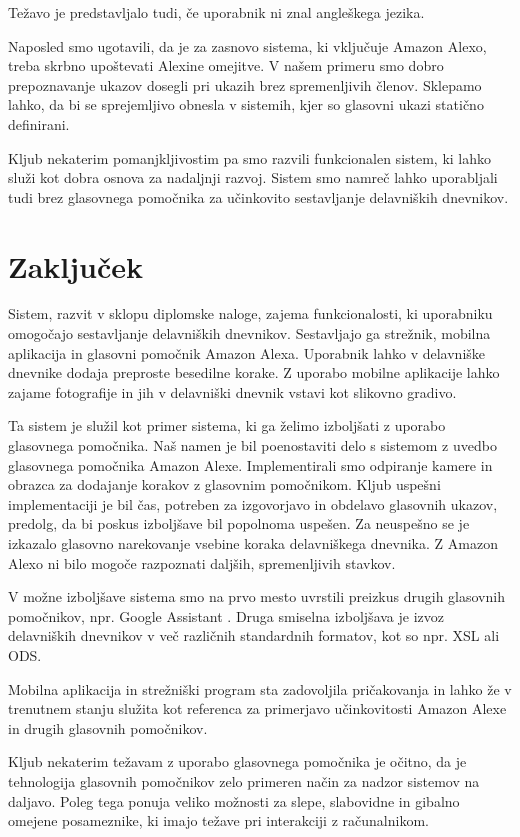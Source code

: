 \documentclass[a4paper, 12pt]{book}
\begin{document}
Težavo je predstavljalo tudi, če uporabnik ni znal angleškega jezika.

Naposled smo ugotavili, da je za zasnovo sistema, ki vključuje Amazon Alexo, treba skrbno upoštevati Alexine omejitve.
V našem primeru smo dobro prepoznavanje ukazov dosegli pri ukazih brez spremenljivih členov.
Sklepamo lahko, da bi se sprejemljivo obnesla v sistemih, kjer so glasovni ukazi statično definirani.

Kljub nekaterim pomanjkljivostim pa smo razvili funkcionalen sistem, ki lahko služi kot dobra osnova za nadaljnji razvoj.
Sistem smo namreč lahko uporabljali tudi brez glasovnega pomočnika za učinkovito sestavljanje delavniških dnevnikov.




\chapter{Zaključek}

Sistem, razvit v sklopu diplomske naloge, zajema funkcionalosti, ki uporabniku omogočajo sestavljanje delavniških dnevnikov.
Sestavljajo ga strežnik, mobilna aplikacija in glasovni pomočnik Amazon Alexa.
Uporabnik lahko v delavniške dnevnike dodaja preproste besedilne korake.
Z uporabo mobilne aplikacije lahko zajame fotografije in jih v delavniški dnevnik vstavi kot slikovno gradivo.

Ta sistem je služil kot primer sistema, ki ga želimo izboljšati z uporabo glasovnega pomočnika.
Naš namen je bil poenostaviti delo s sistemom z uvedbo glasovnega pomočnika Amazon Alexe.
Implementirali smo odpiranje kamere in obrazca za dodajanje korakov z glasovnim pomočnikom.
Kljub uspešni implementaciji je bil čas, potreben za izgovorjavo in obdelavo glasovnih ukazov, predolg, da bi poskus izboljšave bil popolnoma uspešen.
Za neuspešno se je izkazalo glasovno narekovanje vsebine koraka delavniškega dnevnika.
Z Amazon Alexo ni bilo mogoče razpoznati daljših, spremenljivih stavkov.

V možne izboljšave sistema smo na prvo mesto uvrstili preizkus drugih glasovnih pomočnikov, npr. Google Assistant \cite{googleass}.
Druga smiselna izboljšava je izvoz delavniških dnevnikov v več različnih standardnih formatov, kot so npr. XSL ali ODS.

Mobilna aplikacija in strežniški program sta zadovoljila pričakovanja in lahko že v trenutnem stanju služita kot referenca za primerjavo učinkovitosti Amazon Alexe in drugih glasovnih pomočnikov.

Kljub nekaterim težavam z uporabo glasovnega pomočnika je očitno, da je tehnologija glasovnih pomočnikov zelo primeren način za nadzor sistemov na daljavo.
Poleg tega ponuja veliko možnosti za slepe, slabovidne in gibalno omejene posameznike, ki imajo težave pri interakciji z računalnikom.




\newpage %
\ \\
\clearpage
{}

\printbibliography
\end{document}
